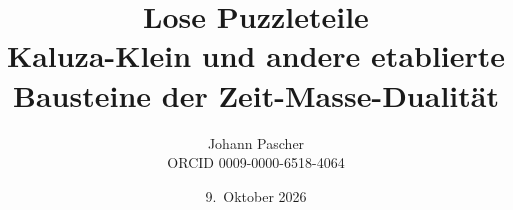 \documentclass[11pt,a4paper]{report}
\title{Lose Puzzleteile\\[0.5em]
  \large Kaluza-Klein und andere etablierte Bausteine der Zeit-Masse-Dualität}
\date{9.~Oktober 2026}
\author{Johann Pascher\\\small ORCID 0009-0000-6518-4064}
\begin{document}
\renewcommand{\thechapter}{}
\renewcommand{\thesection}{\arabic{section}}
\maketitle
\tableofcontents

\end{document}
